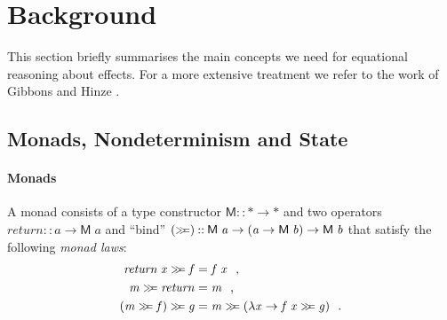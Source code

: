 \documentclass{jfp}
\newcommand{\Conid}[1]{\mathit{#1}}
\newcommand{\Varid}[1]{\mathit{#1}}
\let\Varid\mathit
\let\Conid\mathsf
\begin{document}
%

\section{Background}
\label{sec:background}
This section briefly summarises the main concepts we need for equational
reasoning about effects.
For a more extensive treatment we refer to the work of Gibbons and Hinze
\cite{GibbonsHinze:11:Just}.

\subsection{Monads, Nondeterminism and State}
\paragraph{Monads}
A monad consists of a type constructor \ensuremath{\Conid{M}\mathbin{::}\mathbin{*}\to \mathbin{*}} and two operators \ensuremath{\Varid{return}\mathbin{::}\Varid{a}\to \Conid{M}\;\Varid{a}} and ``bind'' \ensuremath{(\mathrel{\hstretch{0.7}{>\!\!>\!\!=}})\mathbin{::}\Conid{M}\;\Varid{a}\to (\Varid{a}\to \Conid{M}\;\Varid{b})\to \Conid{M}\;\Varid{b}} that satisfy the following {\em monad laws}:
\begin{align}
  \ensuremath{\Varid{return}\;\Varid{x}\mathrel{\hstretch{0.7}{>\!\!>\!\!=}}\Varid{f}} &= \ensuremath{\Varid{f}\;\Varid{x}}\mbox{~~,} \label{eq:monad-bind-ret}\\
  \ensuremath{\Varid{m}\mathrel{\hstretch{0.7}{>\!\!>\!\!=}}\Varid{return}} &= \ensuremath{\Varid{m}} \mbox{~~,} \label{eq:monad-ret-bind}\\
  \ensuremath{(\Varid{m}\mathrel{\hstretch{0.7}{>\!\!>\!\!=}}\Varid{f})\mathrel{\hstretch{0.7}{>\!\!>\!\!=}}\Varid{g}} &= \ensuremath{\Varid{m}\mathrel{\hstretch{0.7}{>\!\!>\!\!=}}(\lambda \Varid{x}\to \Varid{f}\;\Varid{x}\mathrel{\hstretch{0.7}{>\!\!>\!\!=}}\Varid{g})} \mbox{~~.}
    \label{eq:monad-assoc}
\end{align}
\end{document}

